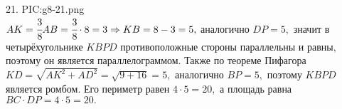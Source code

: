 21. {{PIC:g8-21.png}}\\
$AK=\cfrac{3}{8}AB=\cfrac{3}{8}\cdot8=3\Rightarrow KB=8-3=5,$ аналогично $DP=5,$ значит в четырёхугольнике $KBPD$ противоположные стороны параллельны и равны, поэтому он является параллелограммом. Также по теореме Пифагора $KD=\sqrt{AK^2+AD^2}=\sqrt{9+16}=5,$ аналогично $BP=5,$ поэтому $KBPD$ является ромбом. Его периметр равен $4\cdot5=20,$ а площадь равна $BC\cdot DP=4\cdot5=20.$\\
